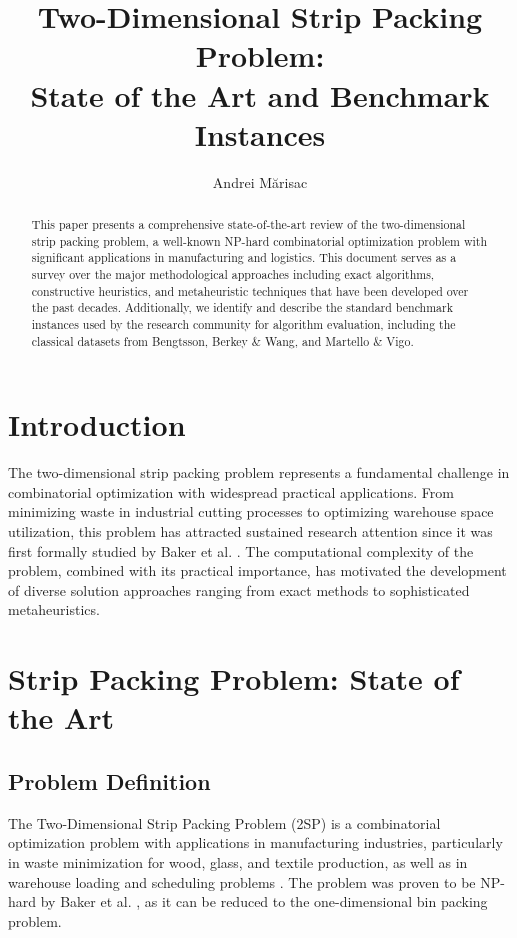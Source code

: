 \documentclass[11pt,a4paper]{article}
\title{\textbf{Two-Dimensional Strip Packing Problem:\\State of the Art and Benchmark Instances}}
\author {Andrei Mărisac}
\date{}
\begin{document}
\maketitle

\begin{abstract}
This paper presents a comprehensive state-of-the-art review of the two-dimensional strip packing problem, a well-known NP-hard combinatorial optimization problem with significant applications in manufacturing and logistics. This document serves as a survey over the major methodological approaches including exact algorithms, constructive heuristics, and metaheuristic techniques that have been developed over the past decades. Additionally, we identify and describe the standard benchmark instances used by the research community for algorithm evaluation, including the classical datasets from Bengtsson, Berkey \& Wang, and Martello \& Vigo.
\end{abstract}

\section{Introduction}

The two-dimensional strip packing problem represents a fundamental challenge in combinatorial optimization with widespread practical applications. From minimizing waste in industrial cutting processes to optimizing warehouse space utilization, this problem has attracted sustained research attention since it was first formally studied by Baker et al. \cite{baker1980}. The computational complexity of the problem, combined with its practical importance, has motivated the development of diverse solution approaches ranging from exact methods to sophisticated metaheuristics.

\section{Strip Packing Problem: State of the Art}

\subsection{Problem Definition}

The Two-Dimensional Strip Packing Problem (2SP) is a combinatorial optimization problem with applications in manufacturing industries, particularly in waste minimization for wood, glass, and textile production, as well as in warehouse loading and scheduling problems \cite{lodi2002,augustine2006}. The problem was proven to be NP-hard by Baker et al. \cite{baker1980}, as it can be reduced to the one-dimensional bin packing problem.
\end{document}
